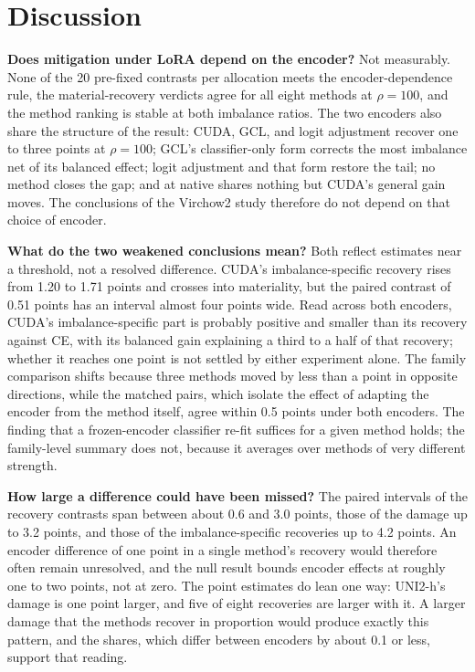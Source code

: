 \section{Discussion}
\label{sec:discussion}
\textbf{Does mitigation under LoRA depend on the encoder?} Not measurably. None of the 20 pre-fixed contrasts per allocation meets the encoder-dependence rule, the material-recovery verdicts agree for all eight methods at $\rho=100$, and the method ranking is stable at both imbalance ratios. The two encoders also share the structure of the result: CUDA, GCL, and logit adjustment recover one to three points at $\rho=100$; GCL's classifier-only form corrects the most imbalance net of its balanced effect; logit adjustment and that form restore the tail; no method closes the gap; and at native shares nothing but CUDA's general gain moves. The conclusions of the Virchow2 study \citep{queisler2026mitigationBracs} therefore do not depend on that choice of encoder.

\textbf{What do the two weakened conclusions mean?} Both reflect estimates near a threshold, not a resolved difference. CUDA's imbalance-specific recovery rises from 1.20 to 1.71 points and crosses into materiality, but the paired contrast of 0.51 points has an interval almost four points wide. Read across both encoders, CUDA's imbalance-specific part is probably positive and smaller than its recovery against CE, with its balanced gain explaining a third to a half of that recovery; whether it reaches one point is not settled by either experiment alone. The family comparison shifts because three methods moved by less than a point in opposite directions, while the matched pairs, which isolate the effect of adapting the encoder from the method itself, agree within 0.5 points under both encoders. The finding that a frozen-encoder classifier re-fit suffices for a given method holds; the family-level summary does not, because it averages over methods of very different strength.

\textbf{How large a difference could have been missed?} The paired intervals of the recovery contrasts span between about 0.6 and 3.0 points, those of the damage up to 3.2 points, and those of the imbalance-specific recoveries up to 4.2 points. An encoder difference of one point in a single method's recovery would therefore often remain unresolved, and the null result bounds encoder effects at roughly one to two points, not at zero. The point estimates do lean one way: UNI2-h's damage is one point larger, and five of eight recoveries are larger with it. A larger damage that the methods recover in proportion would produce exactly this pattern, and the shares, which differ between encoders by about 0.1 or less, support that reading.


